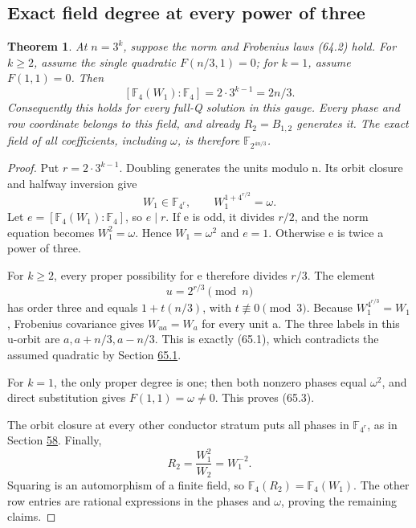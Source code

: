 \documentclass[11pt,reqno]{amsart}
\theoremstyle{plain}
\newtheorem{theorem}{Theorem}[section]
\begin{document}
\subsection{Exact field degree at every power of three}\label{sec:65.2}

\begin{theorem}
At \(n=3^k\), suppose the norm and Frobenius laws
(64.2) hold. For \(k\ge2\), assume the single quadratic
\(F(n/3,1)=0\); for \(k=1\), assume \(F(1,1)=0\).
Then
\begin{equation*}
 \boxed{
 [\mathbb F_4(W_1):\mathbb F_4]=2\cdot3^{k-1}=2n/3.
 }
 \tag{65.3}
\end{equation*}
Consequently this holds for every full-Q solution in this gauge.
Every phase and row coordinate belongs to this field, and already
\(R_2=B_{1,2}\) generates it. The exact field of all coefficients,
including \(\omega\), is therefore
\(\mathbb F_{2^{4n/3}}\).
\end{theorem}

\begin{proof}
Put \(r=2\cdot3^{k-1}\). Doubling generates the units
modulo n. Its orbit closure and halfway inversion give
\[
 W_1\in\mathbb F_{4^r},\qquad
 W_1^{1+4^{r/2}}=\omega.
\]
Let \(e=[\mathbb F_4(W_1):\mathbb F_4]\), so \(e\mid r\).
If e is odd, it divides \(r/2\), and the norm equation becomes
\(W_1^2=\omega\). Hence \(W_1=\omega^2\) and \(e=1\).
Otherwise e is twice a power of three.

For \(k\ge2\), every proper possibility for e therefore divides
\(r/3\). The element
\[
 u=2^{r/3}\pmod n
\]
has order three and equals \(1+t(n/3)\), with \(t\not\equiv0\pmod3\).
Because \(W_1^{4^{r/3}}=W_1\), Frobenius covariance gives
\(W_{ua}=W_a\) for every unit a. The three labels in this
u-orbit are \(a,a+n/3,a-n/3\). This is exactly (65.1), which
contradicts the assumed quadratic by Section \hyperref[sec:65.1]{65.1}.

For \(k=1\), the only proper degree is one; then both nonzero
phases equal \(\omega^2\), and direct substitution gives
\(F(1,1)=\omega\ne0\). This proves (65.3).

The orbit closure at every other conductor stratum puts all phases
in \(\mathbb F_{4^r}\), as in Section \hyperref[sec:58]{58}. Finally,
\[
 R_2=\frac{W_1^2}{W_2}=W_1^{-2}.
\]
Squaring is an automorphism of a finite field, so
\(\mathbb F_4(R_2)=\mathbb F_4(W_1)\). The other row entries
are rational expressions in the phases and \(\omega\), proving
the remaining claims.
\end{proof}
\end{document}
